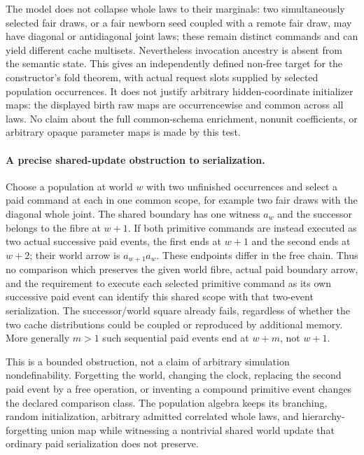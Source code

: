 \documentclass[11pt]{article}\usepackage{amsmath,amssymb,geometry}\geometry{margin=1in}
\begin{document}
The model does not collapse whole laws to their marginals: two simultaneously selected fair draws, or a fair newborn seed coupled with a remote fair draw, may have diagonal or antidiagonal joint laws; these remain distinct commands and can yield different cache multisets. Nevertheless invocation ancestry is absent from the semantic state. This gives an independently defined non-free target for the constructor's fold theorem, with actual request slots supplied by selected population occurrences. It does not justify arbitrary hidden-coordinate initializer maps: the displayed birth raw maps are occurrencewise and common across all laws. No claim about the full common-schema enrichment, nonunit coefficients, or arbitrary opaque parameter maps is made by this test.

\paragraph{A precise shared-update obstruction to serialization.}
Choose a population at world $w$ with two unfinished occurrences and select a paid command at each in one common scope, for example two fair draws with the diagonal whole joint. The shared boundary has one witness $a_w$ and the successor belongs to the fibre at $w+1$. If both primitive commands are instead executed as two actual successive paid events, the first ends at $w+1$ and the second ends at $w+2$; their world arrow is $a_{w+1}a_w$. These endpoints differ in the free chain. Thus no comparison which preserves the given world fibre, actual paid boundary arrow, and the requirement to execute each selected primitive command as its own successive paid event can identify this shared scope with that two-event serialization. The successor/world square already fails, regardless of whether the two cache distributions could be coupled or reproduced by additional memory. More generally $m>1$ such sequential paid events end at $w+m$, not $w+1$.

This is a bounded obstruction, not a claim of arbitrary simulation nondefinability. Forgetting the world, changing the clock, replacing the second paid event by a free operation, or inventing a compound primitive event changes the declared comparison class. The population algebra keeps its branching, random initialization, arbitrary admitted correlated whole laws, and hierarchy-forgetting union map while witnessing a nontrivial shared world update that ordinary paid serialization does not preserve.
\end{document}
